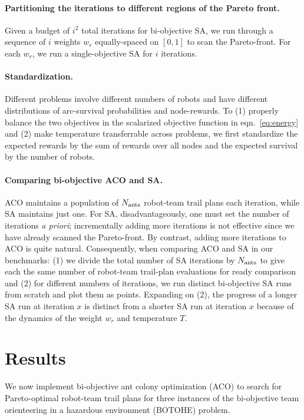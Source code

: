 \documentclass[fleqn,10pt,lineno]{wlpeerj}
\begin{document}
\paragraph{Partitioning the iterations to different regions of the Pareto front.}
Given a budget of $i^2$ total iterations for bi-objective SA, we run through a sequence of $i$ weights $w_r$ equally-spaced on $[0, 1]$ to scan the Pareto-front. For each $w_r$, we run a single-objective SA for $i$ iterations. 

\paragraph{Standardization.}
Different problems involve different numbers of robots and have different distributions of arc-survival probabilities and node-rewards.
To (1) properly balance the two objectives in the scalarized objective function in eqn.~\ref{eq:energy} and (2) make temperature transferrable across problems, we first standardize the expected rewards by the sum of rewards over all nodes and the expected survival by the number of robots.

\paragraph{Comparing bi-objective ACO and SA.}
ACO maintains a population of $N_{\rm ants}$ robot-team trail plans each iteration, while SA maintains just one.
For SA, disadvantageously, one must set the number of iterations \emph{a priori}; incrementally adding more iterations is not effective since we have already scanned the Pareto-front. By contrast, adding more iterations to ACO is quite natural.
Consequently, when comparing ACO and SA in our benchmarks: (1) we divide the total number of SA iterations by $N_{\rm ants}$ to give each the same number of robot-team trail-plan evaluations for ready comparison and (2) for different numbers of iterations, we run distinct bi-objective SA runs from scratch and plot them as points. Expanding on (2), the progress of a longer SA run at iteration $x$ is distinct from a shorter SA run at iteration $x$ because of the dynamics of the weight $w_r$ and temperature $T$.

\section{Results}
We now implement bi-objective ant colony optimization (ACO) to search for Pareto-optimal robot-team trail plans for three instances of the bi-objective team orienteering in a hazardous environment (BOTOHE) problem.
\end{document}
